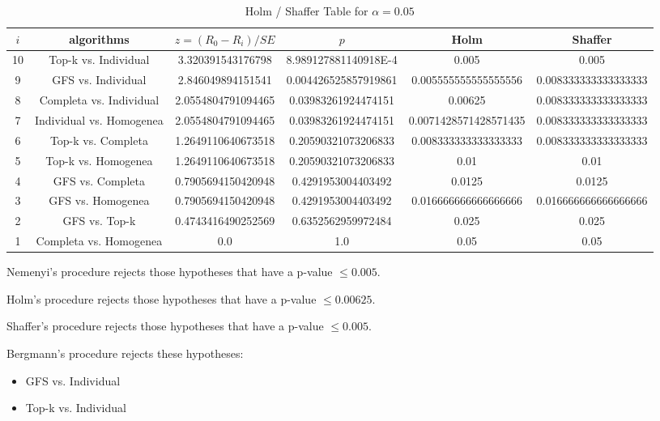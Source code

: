 \documentclass[a4paper,10pt]{article}
\begin{document}
\begin{landscape}
\begin{table}[!htp]
\centering\tiny
\caption{Holm / Shaffer Table for $\alpha=0.05$}
\begin{tabular}{cccccc}
$i$&algorithms&$z=(R_0 - R_i)/SE$&$p$&Holm&Shaffer\\
\hline
10&Top-k vs. Individual&3.320391543176798&8.989127881140918E-4&0.005&0.005\\
9&GFS vs. Individual&2.846049894151541&0.004426525857919861&0.005555555555555556&0.008333333333333333\\
8&Completa vs. Individual&2.0554804791094465&0.03983261924474151&0.00625&0.008333333333333333\\
7&Individual vs. Homogenea&2.0554804791094465&0.03983261924474151&0.0071428571428571435&0.008333333333333333\\
6&Top-k vs. Completa&1.2649110640673518&0.20590321073206833&0.008333333333333333&0.008333333333333333\\
5&Top-k vs. Homogenea&1.2649110640673518&0.20590321073206833&0.01&0.01\\
4&GFS vs. Completa&0.7905694150420948&0.4291953004403492&0.0125&0.0125\\
3&GFS vs. Homogenea&0.7905694150420948&0.4291953004403492&0.016666666666666666&0.016666666666666666\\
2&GFS vs. Top-k&0.4743416490252569&0.6352562959972484&0.025&0.025\\
1&Completa vs. Homogenea&0.0&1.0&0.05&0.05\\
\hline
\end{tabular}
\end{table}
Nemenyi's procedure rejects those hypotheses that have a p-value $\le0.005$.


Holm's procedure rejects those hypotheses that have a p-value $\le0.00625$.


Shaffer's procedure rejects those hypotheses that have a p-value $\le0.005$.


Bergmann's procedure rejects these hypotheses:


\begin{itemize}


\item GFS vs. Individual
\item Top-k vs. Individual
\end{itemize}



\end{landscape}
\end{document}
